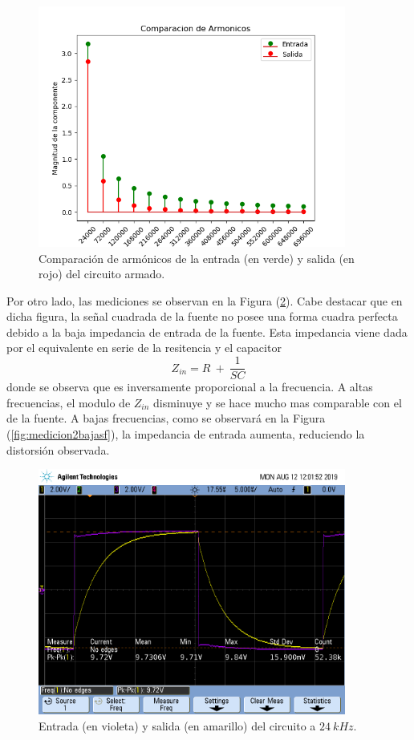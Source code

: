 \documentclass[a4paper]{article}
\begin{document}
\begin{figure}[H]
	\centering
	\includegraphics[width=0.9\textwidth]{ComparacionDeArmionicos}
\caption{Comparación de armónicos de la entrada (en verde) y salida (en rojo) del circuito armado.}
	\label{fig:armonicoscomparacion}
\end{figure}

Por otro lado, las mediciones se observan en la Figura (\ref{fig:medicion2}). Cabe destacar que en dicha figura, la señal cuadrada de la fuente no posee una forma cuadra perfecta debido a la baja impedancia de entrada de la fuente. Esta impedancia viene dada por el equivalente en serie de la resitencia y el capacitor
\[
	Z_{in} = R \ + \ \frac{1}{SC}
\]
donde se observa que es inversamente proporcional a la frecuencia. A altas frecuencias, el modulo de $Z_{in}$ disminuye y se hace mucho mas comparable con el de la fuente. A bajas frecuencias, como se observará en la Figura (\ref{fig:medicion2bajasf}), la impedancia de entrada aumenta, reduciendo la distorsión observada.

\begin{figure}[H]
	\centering
	\includegraphics[width=0.9\textwidth , trim={0.7cm 6.25cm  0 3.5cm},clip]{scope_1}
\caption{Entrada (en violeta) y salida (en amarillo) del circuito a $ 24 \ kHz $.}
	\label{fig:medicion2}
\end{figure}
\end{document}
